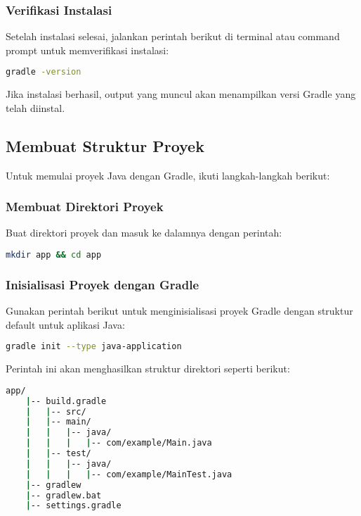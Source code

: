 \subsubsection{Verifikasi Instalasi}
Setelah instalasi selesai, jalankan perintah berikut di terminal atau command prompt untuk memverifikasi instalasi:

\begin{lstlisting}[language=bash]
	gradle -version
\end{lstlisting}

Jika instalasi berhasil, output yang muncul akan menampilkan versi Gradle yang telah diinstal.


\subsection{Membuat Struktur Proyek}
Untuk memulai proyek Java dengan Gradle, ikuti langkah-langkah berikut:

\subsubsection{Membuat Direktori Proyek}
Buat direktori proyek dan masuk ke dalamnya dengan perintah:
\begin{lstlisting}[language=bash]
	mkdir app && cd app
\end{lstlisting}

\subsubsection{Inisialisasi Proyek dengan Gradle}
Gunakan perintah berikut untuk menginisialisasi proyek Gradle dengan struktur default untuk aplikasi Java:
\begin{lstlisting}[language=bash]
	gradle init --type java-application
\end{lstlisting}

Perintah ini akan menghasilkan struktur direktori seperti berikut:
\begin{lstlisting}[language=bash]
	app/
	|-- build.gradle
	|	|-- src/
	|   |-- main/
	|   |   |-- java/
	|   |   |   |-- com/example/Main.java
	|   |-- test/
	|   |   |-- java/
	|   |   |   |-- com/example/MainTest.java
	|-- gradlew
	|-- gradlew.bat
	|-- settings.gradle
	
\end{lstlisting}

